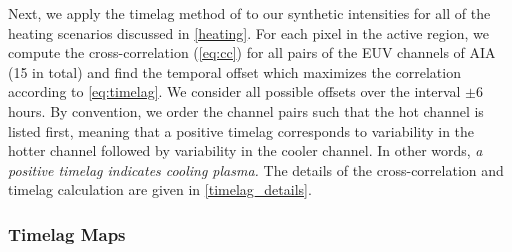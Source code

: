 Next, we apply the timelag method of \citet{viall_evidence_2012} to our synthetic intensities for all of the heating scenarios discussed in \autoref{heating}. For each pixel in the active region, we compute the cross-correlation (\autoref{eq:cc}) for all pairs of the EUV channels of AIA (15 in total) and find the temporal offset which maximizes the correlation according to \autoref{eq:timelag}. We consider all possible offsets over the interval $\pm6$ hours. By convention, we order the channel pairs such that the hot channel is listed first, meaning that a positive timelag corresponds to variability in the hotter channel followed by variability in the cooler channel. In other words, \textit{a positive timelag indicates cooling plasma.} The details of the cross-correlation and timelag calculation are given in \autoref{timelag_details}.

\subsubsection{Timelag Maps}\label{timelag_maps}

